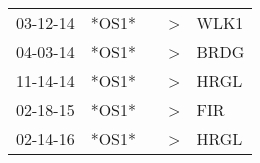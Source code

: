 \begin{supertabular}{p{0.07\textwidth}p{0.06\textwidth}p{0.02\textwidth}p{0.02\textwidth}p{0.06\textwidth}}
          03-12-14\textsuperscript{} &  *OS1* &   &  \textgreater &  WLK1\textsuperscript{} \\
          04-03-14\textsuperscript{} &  *OS1* &   &  \textgreater &  BRDG\textsuperscript{} \\
          11-14-14\textsuperscript{} &  *OS1* &   &  \textgreater &  HRGL\textsuperscript{} \\
          02-18-15\textsuperscript{} &  *OS1* &   &  \textgreater &   FIR\textsuperscript{} \\
          02-14-16\textsuperscript{} &  *OS1* &   &  \textgreater &  HRGL\textsuperscript{} \\
\end{supertabular}
